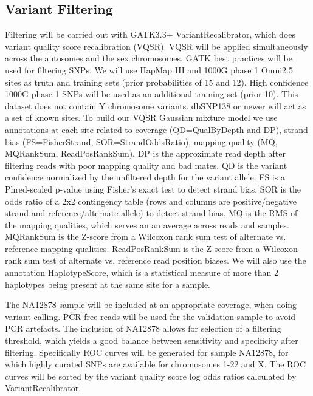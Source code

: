 \subsection{Variant Filtering}
Filtering will be carried out with GATK3.3+ VariantRecalibrator, which does variant quality score recalibration (VQSR). VQSR will be applied simultaneously across the autosomes and the sex chromosomes. GATK best practices will be used for filtering SNPs.
We will use HapMap III and 1000G phase 1 Omni2.5 sites as truth and training sets (prior probabilities of 15 and 12). High confidence 1000G phase 1 SNPs will be used as an additional training set (prior 10). This dataset does not contain Y chromosome variants. %
dbSNP138 or newer will act as a set of known sites.
To build our VQSR Gaussian mixture model we use annotations at each site related to coverage (QD=QualByDepth and DP), strand bias (FS=FisherStrand, SOR=StrandOddsRatio), mapping quality (MQ, MQRankSum, ReadPosRankSum).
DP is the approximate read depth after filtering reads with poor mapping quality and bad mates. QD is the variant confidence normalized by the unfiltered depth for the variant allele. FS is a Phred-scaled p-value using Fisher's exact test to detect strand bias. SOR is the odds ratio of a 2x2 contingency table (rows and columns are positive/negative strand and reference/alternate allele) to detect strand bias. MQ is the RMS of the mapping qualities, which serves an an average across reads and samples. MQRankSum is the Z-score from a Wilcoxon rank sum test of alternate vs. reference mapping qualities. ReadPosRankSum is the Z-score from a Wilcoxon rank sum test of alternate vs. reference read position biases.
We will also use the annotation HaplotypeScore, which is a statistical measure of more than 2 haplotypes being present at the same site for a sample.

The NA12878 sample will be included at an appropriate coverage, when doing variant calling. PCR-free reads will be used for the validation sample to avoid PCR artefacts. The inclusion of NA12878 allows for selection of a filtering threshold, which yields a good balance between sensitivity and specificity after filtering. Specifically ROC curves will be generated for sample NA12878, for which highly curated SNPs
are available for chromosomes 1-22 and X. The ROC curves will be sorted by the variant quality score log odds ratios calculated by VariantRecalibrator.

